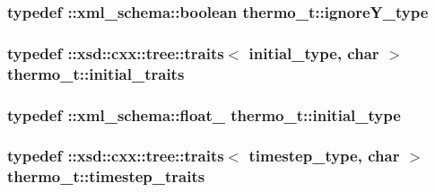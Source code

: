 \subsubsection[{\texorpdfstring{ignore\+Y\+\_\+type}{ignoreY_type}}]{\setlength{\rightskip}{0pt plus 5cm}typedef \+::{\bf xml\+\_\+schema\+::boolean} {\bf thermo\+\_\+t\+::ignore\+Y\+\_\+type}}\hypertarget{classthermo__t_a20faf1f752e18e7d9e8f2f7b943fbf01}{}\label{classthermo__t_a20faf1f752e18e7d9e8f2f7b943fbf01}
\subsubsection[{\texorpdfstring{initial\+\_\+traits}{initial_traits}}]{\setlength{\rightskip}{0pt plus 5cm}typedef \+::xsd\+::cxx\+::tree\+::traits$<$ {\bf initial\+\_\+type}, char $>$ {\bf thermo\+\_\+t\+::initial\+\_\+traits}}\hypertarget{classthermo__t_a857c3d12cdb293a7ec3ea2e2ac52812c}{}\label{classthermo__t_a857c3d12cdb293a7ec3ea2e2ac52812c}
\subsubsection[{\texorpdfstring{initial\+\_\+type}{initial_type}}]{\setlength{\rightskip}{0pt plus 5cm}typedef \+::{\bf xml\+\_\+schema\+::float\+\_\+} {\bf thermo\+\_\+t\+::initial\+\_\+type}}\hypertarget{classthermo__t_a3b889c80ce97870a6967ebee963438ed}{}\label{classthermo__t_a3b889c80ce97870a6967ebee963438ed}
\subsubsection[{\texorpdfstring{timestep\+\_\+traits}{timestep_traits}}]{\setlength{\rightskip}{0pt plus 5cm}typedef \+::xsd\+::cxx\+::tree\+::traits$<$ {\bf timestep\+\_\+type}, char $>$ {\bf thermo\+\_\+t\+::timestep\+\_\+traits}}\hypertarget{classthermo__t_a22923d5493f01433df1b956905308222}{}\label{classthermo__t_a22923d5493f01433df1b956905308222}
